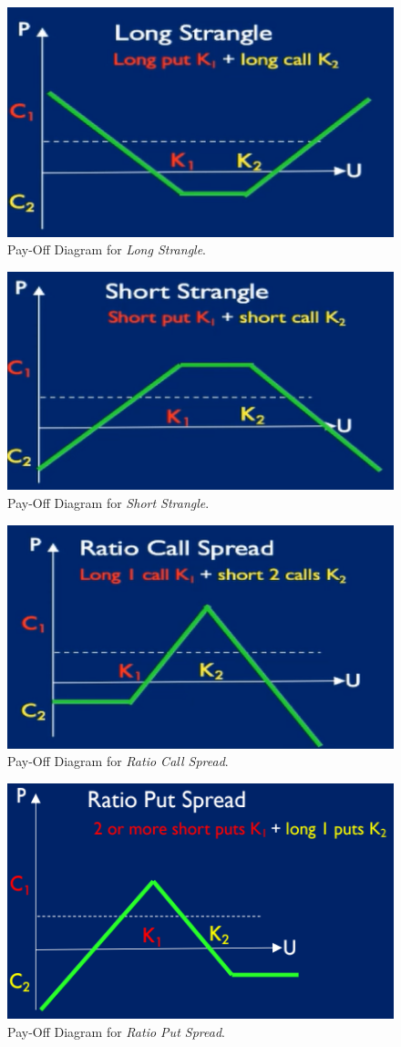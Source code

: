 \documentclass[11pt,a4paper]{article}
\begin{document}
  \begin{figure}[ht!]
    \centering
    \includegraphics[width=.5\textwidth]{longStrangle.PNG}
    \caption{Pay-Off Diagram for \textit{Long Strangle}.}
    \label{fig_LongStrangle}
  \end{figure}

  \begin{figure}[ht!]
    \centering
    \includegraphics[width=.5\textwidth]{shortStrangle.PNG}
    \caption{Pay-Off Diagram for \textit{Short Strangle}.}
    \label{fig_ShortStrangle}
  \end{figure}

  \begin{figure}[ht!]
    \centering
    \includegraphics[width=.5\textwidth]{ratioCallSpread.PNG}
    \caption{Pay-Off Diagram for \textit{Ratio Call Spread}.}
    \label{fig_RatioCallSpread}
  \end{figure}

  \begin{figure}[ht!]
    \centering
    \includegraphics[width=.5\textwidth]{ratioPutSpread.PNG}
    \caption{Pay-Off Diagram for \textit{Ratio Put Spread}.}
    \label{fig_RatioPutSpread}
  \end{figure}
\end{document}
